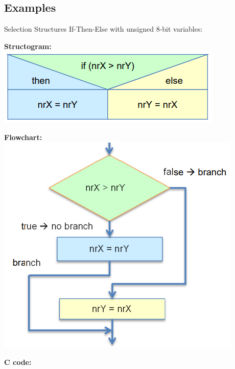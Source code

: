\subsection{Examples}



\begin{example2}{Selection Structures}
If-Then-Else with unsigned 8-bit variables:

\textbf{Structogram:}\\
\includegraphics[width=0.7\linewidth]{images/structogramex1.png}
\vspace{2mm}\\
\begin{minipage}{0.6\linewidth}
\textbf{Flowchart:}\\
\includegraphics[width=\linewidth]{images/flowchartex1.png}
\end{minipage}
\begin{minipage}{0.38\linewidth}
\textbf{C code:}
\vspace{2mm}\\

\end{minipage}
\end{example2}
